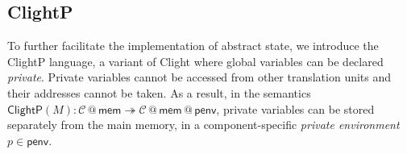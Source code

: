 \documentclass[acmsmall,screen,review,anonymous]{acmart}
\newcommand{\kw}[1]{\ensuremath{ \mathsf{#1} }}
\begin{document}

\subsection{ClightP} %
\label{sec:overview:clightp}
To further facilitate the implementation of abstract state,
we introduce the ClightP language,
a variant of Clight
where global variables can be declared \emph{private}.
Private variables cannot be accessed
from other translation units and
their addresses cannot be taken.
As a result, in the semantics
$
  \kw{ClightP}(M) :
    \mathcal{C} \mathbin@ \kw{mem}
    \twoheadrightarrow
    \mathcal{C} \mathbin@ \kw{mem} \mathbin@ \kw{penv}
$,
private variables can be stored
separately from the main memory,
in a component-specific
\emph{private environment} $p \in \kw{penv}$.
\end{document}
